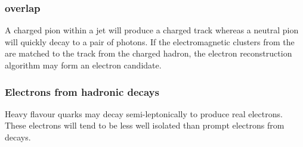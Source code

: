\subsubsection{\HepProcess{\Ppipm \Ppizero} overlap}
A charged pion within a jet will produce a charged track whereas a neutral pion
will quickly decay to a pair of photons. If the electromagnetic clusters from
the \Ppizero are matched to the track from the charged hadron, the electron
reconstruction algorithm may form an electron candidate.

\subsubsection{Electrons from hadronic decays}
Heavy flavour quarks may decay semi-leptonically to produce real electrons. These
electrons will tend to be less well isolated than prompt electrons from \PW
decays.

